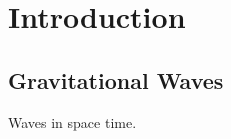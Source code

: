 \chapter{Introduction}
\label{chap:intro}
\chaptoc{}
\newpage

\section{Gravitational Waves}
\label{sec:gws}

Waves in space time.

\lipsum[1-9] %
